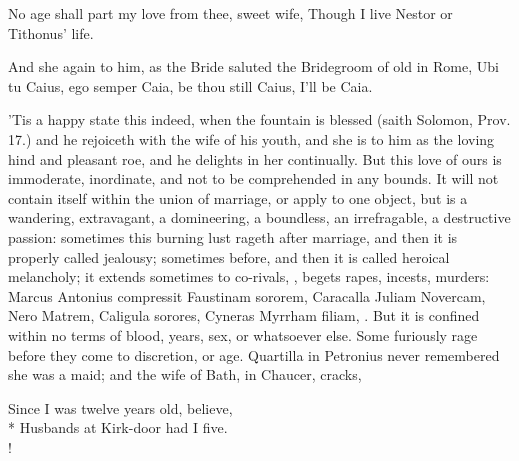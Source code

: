 No age shall part my love from thee, sweet wife,
Though I live Nestor or Tithonus' life.

And she again to him, as the Bride saluted the Bridegroom of old
in Rome, Ubi tu Caius, ego semper Caia, be thou still Caius, I'll be
Caia.

'Tis a happy state this indeed, when the fountain is blessed (saith
Solomon, Prov.  17.) and he rejoiceth with the wife of his youth, and
she is to him as the loving hind and pleasant roe, and he delights in
her continually. But this love of ours is immoderate, inordinate, and
not to be comprehended in any bounds. It will not contain itself within
the union of marriage, or apply to one object, but is a wandering,
extravagant, a domineering, a boundless, an irrefragable, a destructive
passion: sometimes this burning lust rageth after marriage, and then it
is properly called jealousy; sometimes before, and then it is called
heroical melancholy; it extends sometimes to co-rivals, \etc{}, begets
rapes, incests, murders: Marcus Antonius compressit Faustinam sororem,
Caracalla Juliam Novercam, Nero Matrem, Caligula sorores, Cyneras
Myrrham filiam, \etc{}. But it is confined within no terms of blood, years,
sex, or whatsoever else. Some furiously rage before they come to
discretion, or age. Quartilla in Petronius never remembered she
was a maid; and the wife of Bath, in Chaucer, cracks,
%
{\gothfont%
\begin{versewithlinenos}{2}{1}{1}%
Since I was twelve years old, believe,\\*
Husbands at Kirk-door had I five.\\!
\end{versewithlinenos}%
}%

